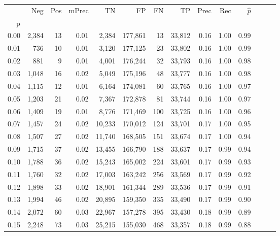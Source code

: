 \begin{tabular}{rrrrrrrrrrrrrr}
\toprule
{} &    Neg &  Pos & mPrec &       TN &       FP &      FN &      TP &  Prec &   Rec & $\hat{p}$ \\
p    &        &      &       &          &          &         &         &       &       &           \\
\midrule
0.00 &  2,384 &   13 &  0.01 &    2,384 &  177,861 &      13 &  33,812 &  0.16 &  1.00 &      0.99 \\
0.01 &    736 &   10 &  0.01 &    3,120 &  177,125 &      23 &  33,802 &  0.16 &  1.00 &      0.99 \\
0.02 &    881 &    9 &  0.01 &    4,001 &  176,244 &      32 &  33,793 &  0.16 &  1.00 &      0.98 \\
0.03 &  1,048 &   16 &  0.02 &    5,049 &  175,196 &      48 &  33,777 &  0.16 &  1.00 &      0.98 \\
0.04 &  1,115 &   12 &  0.01 &    6,164 &  174,081 &      60 &  33,765 &  0.16 &  1.00 &      0.97 \\
0.05 &  1,203 &   21 &  0.02 &    7,367 &  172,878 &      81 &  33,744 &  0.16 &  1.00 &      0.97 \\
0.06 &  1,409 &   19 &  0.01 &    8,776 &  171,469 &     100 &  33,725 &  0.16 &  1.00 &      0.96 \\
0.07 &  1,457 &   24 &  0.02 &   10,233 &  170,012 &     124 &  33,701 &  0.17 &  1.00 &      0.95 \\
0.08 &  1,507 &   27 &  0.02 &   11,740 &  168,505 &     151 &  33,674 &  0.17 &  1.00 &      0.94 \\
0.09 &  1,715 &   37 &  0.02 &   13,455 &  166,790 &     188 &  33,637 &  0.17 &  0.99 &      0.94 \\
0.10 &  1,788 &   36 &  0.02 &   15,243 &  165,002 &     224 &  33,601 &  0.17 &  0.99 &      0.93 \\
0.11 &  1,760 &   32 &  0.02 &   17,003 &  163,242 &     256 &  33,569 &  0.17 &  0.99 &      0.92 \\
0.12 &  1,898 &   33 &  0.02 &   18,901 &  161,344 &     289 &  33,536 &  0.17 &  0.99 &      0.91 \\
0.13 &  1,994 &   46 &  0.02 &   20,895 &  159,350 &     335 &  33,490 &  0.17 &  0.99 &      0.90 \\
0.14 &  2,072 &   60 &  0.03 &   22,967 &  157,278 &     395 &  33,430 &  0.18 &  0.99 &      0.89 \\
0.15 &  2,248 &   73 &  0.03 &   25,215 &  155,030 &     468 &  33,357 &  0.18 &  0.99 &      0.88 \\

\end{tabular}
